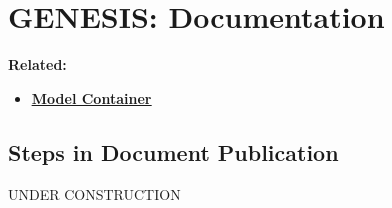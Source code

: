 \documentclass[12pt]{article}
\begin{document}
\section*{GENESIS: Documentation}

{\bf Related:}
\begin{itemize}

\item \href{../model-container/model-container.pdf}{\bf \underline{Model Container}}


\end{itemize}


\subsection*{Steps in Document Publication}


UNDER CONSTRUCTION
\end{document}
